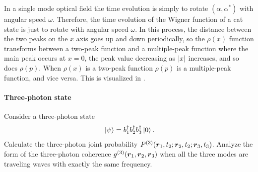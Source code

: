 \documentclass[hyperref, a4paper]{article}
\begin{document}
In a single mode optical field the time evolution is simply to rotate $(\alpha, \alpha^*)$ with angular speed $\omega$.
Therefore, the time evolution of the Wigner function of a cat state is just to rotate  with angular speed $\omega$.
In this process, the distance between the two peaks on the $x$ axis goes up and down periodically, so the $\rho(x)$ function transforms between a two-peak function and a multiple-peak function where the main peak occurs at $x=0$, the peak value decreasing as $\abs{x}$ increases, and so does $\rho(p)$.
When $\rho(x)$ is a two-peak function $\rho(p)$ is a multiple-peak function, and vice versa.
This is visualized in \cite{cat-state}. 

\paragraph{}

\paragraph{Three-photon state} Consider a three-photon state
\begin{equation}
    \ket*{\psi} = b_1^\dagger b_2^\dagger b_3^\dagger \ket*{0}.
\end{equation}
Calculate the three-photon joint probability $P^{(3)}(\vb*{r}_1, t_2; \vb*{r}_2, t_2; \vb*{r}_3, t_3)$. Analyze the form of the three-photon coherence $g^{(3)}(\vb*{r}_1, \vb*{r}_2, \vb*{r}_3)$ when all the three modes are traveling waves with exactly the same frequency.
\end{document}
